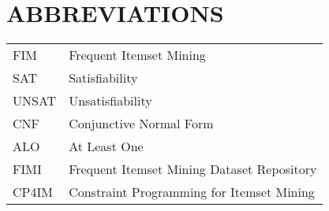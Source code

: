 
\chapter*{ABBREVIATIONS}

\begin{table}[htbp]
    \raggedright
    \begin{tabular}{ll}
        \\
        FIM   & Frequent Itemset Mining                    \\
        SAT   & Satisfiability                             \\
        UNSAT & Unsatisfiability                           \\
        CNF   & Conjunctive Normal Form                    \\
        ALO   & At Least One                               \\
        FIMI  & Frequent Itemset Mining Dataset Repository \\
        CP4IM & Constraint Programming for Itemset Mining  \\
    \end{tabular}
\end{table}